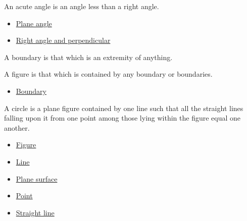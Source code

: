 \begin{definition}
\label{def-euclid-acute-angle}
An acute angle is an angle less than a right angle.
\end{definition}
\begin{lra-not-visible}
\begin{dependencies}
\begin{itemize}
  \item \hyperref[def-euclid-plane-angle]{Plane angle}
  \item \hyperref[def-euclid-right-angle-and-perpendicular]{Right angle and perpendicular}
\end{itemize}
\end{dependencies}
\end{lra-not-visible}

\begin{definition}[Boundary]
\label{def-euclid-boundary}
A boundary is that which is an extremity of anything.
\end{definition}
\begin{lra-not-visible}
\NoLocalDependencies
\end{lra-not-visible}

\begin{definition}[Figure]
\label{def-euclid-figure}
A figure is that which is contained by any boundary or boundaries.
\end{definition}
\begin{lra-not-visible}
\begin{dependencies}
\begin{itemize}
  \item \hyperref[def-euclid-boundary]{Boundary}
\end{itemize}
\end{dependencies}
\end{lra-not-visible}

\begin{definition}[Circle]
\label{def-euclid-circle}
A circle is a plane figure contained by one line such that all the straight
lines falling upon it from one point among those lying within the figure equal
one another.
\end{definition}
\begin{lra-not-visible}
\begin{dependencies}
\begin{itemize}
  \item \hyperref[def-euclid-figure]{Figure}
  \item \hyperref[def-euclid-line]{Line}
  \item \hyperref[def-euclid-plane-surface]{Plane surface}
  \item \hyperref[def-euclid-point]{Point}
  \item \hyperref[def-euclid-straight-line]{Straight line}
\end{itemize}
\end{dependencies}
\end{lra-not-visible}

